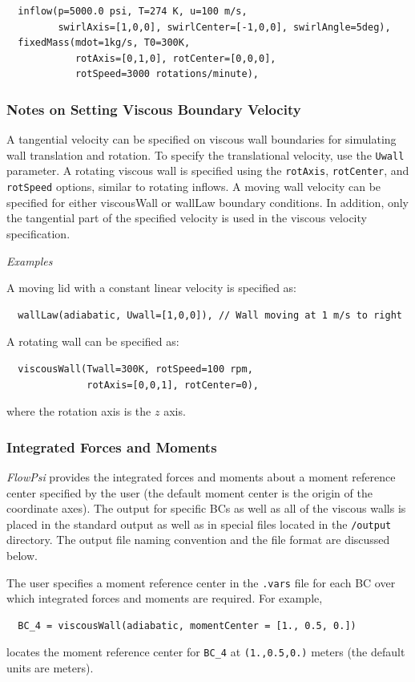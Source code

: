 \documentclass{article}
\begin{document}
\begin{verbatim}
  inflow(p=5000.0 psi, T=274 K, u=100 m/s, 
         swirlAxis=[1,0,0], swirlCenter=[-1,0,0], swirlAngle=5deg),
  fixedMass(mdot=1kg/s, T0=300K, 
            rotAxis=[0,1,0], rotCenter=[0,0,0], 
            rotSpeed=3000 rotations/minute),
\end{verbatim}

\subsubsection{ Notes on Setting Viscous Boundary Velocity }

A tangential velocity can be specified on viscous wall boundaries for
simulating wall translation and rotation.  To specify the translational
velocity, use the {\tt Uwall} parameter.  A rotating viscous wall is
specified using the {\tt rotAxis}, {\tt rotCenter}, and {\tt rotSpeed}
options, similar to rotating inflows.  A moving wall velocity
can be specified for either viscousWall or wallLaw boundary
conditions.  In addition, only the tangential part of the specified
velocity is used in the viscous velocity specification.  

{\center \it Examples}

A moving lid with a constant linear velocity is specified as:
\begin{verbatim}
  wallLaw(adiabatic, Uwall=[1,0,0]), // Wall moving at 1 m/s to right
\end{verbatim}
A rotating wall can be specified as:
\begin{verbatim}
  viscousWall(Twall=300K, rotSpeed=100 rpm, 
              rotAxis=[0,0,1], rotCenter=0),
\end{verbatim}
where the rotation axis is the $z$ axis.


\subsubsection{Integrated Forces and Moments}
\label{integrated_fm}

{\em FlowPsi} provides the integrated forces and moments about a moment
reference center specified by the user (the default moment center is
the origin of the coordinate axes).  The output for specific BCs as
well as all of the viscous walls is placed in the standard output as
well as in special files located in the \verb!/output! directory.  The
output file naming convention and the file format are discussed below.

The user specifies a moment reference center in the \verb!.vars! file for each BC over which integrated forces and moments are required.  For example,
\begin{verbatim}
  BC_4 = viscousWall(adiabatic, momentCenter = [1., 0.5, 0.])
\end{verbatim}
locates the moment reference center for \verb!BC_4! at \verb!(1.,0.5,0.)! meters (the default units are meters).
\end{document}
